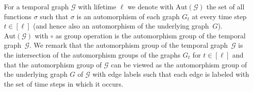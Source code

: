 \documentclass[10pt,a4paper]{article}
\newcommand{\auttg}{\ensuremath{\text{Aut}(\mathcal{G})}}
\begin{document}
For a temporal graph $\mathcal{G}$ with lifetime $\ell$ we denote with $\auttg$
the set of all functions $\sigma$ such that $\sigma$ is an automorphism of each
graph $G_t$ at every time step $t \in [\ell]$ {(and hence also an
automorphism of the underlying graph~$G$). $\auttg$ with $\circ$ as group
operation is the automorphism group of the temporal graph~$\mathcal{G}$.}
%
We remark that the automorphism group of the temporal graph~$\mathcal{G}$
is the intersection of the automorphism groups of the graphs
$G_t$ for $t\in[\ell]$ and that the automorphism group of
$\mathcal{G}$ can be viewed as the automorphism group of the underlying graph
$G$ of $\mathcal{G}$ with edge labels such that each edge is labeled with the set
of time steps in which it occurs.
\end{document}
